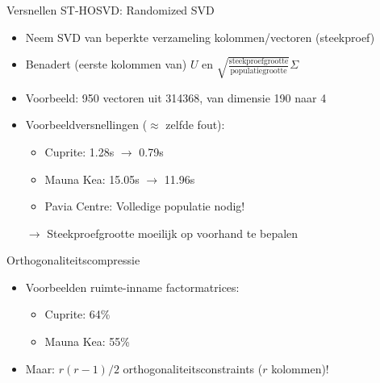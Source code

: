 \documentclass[t,12pt,dutch
\ifx\beamermode\undefined\else,\beamermode\fi
]{beamer}
\begin{document}
\begin{frame}{Versnellen ST-HOSVD: Randomized SVD}
\begin{itemize}
\item Neem SVD van beperkte verzameling kolommen/vectoren (steekproef)
\item Benadert (eerste kolommen van) $U$ en $\sqrt{\frac{\text{steekproefgrootte}}{\text{populatiegrootte}}} \Sigma$
\item Voorbeeld: 950 vectoren uit 314368, van dimensie 190 naar 4
\item Voorbeeldversnellingen ($\approx$ zelfde fout):
\begin{itemize}
\item Cuprite: 1.28s $\rightarrow$ 0.79s
\item Mauna Kea: 15.05s $\rightarrow$ 11.96s
\item Pavia Centre: Volledige populatie nodig!
\end{itemize}
$\rightarrow$ Steekproefgrootte moeilijk op voorhand te bepalen
\end{itemize}
\end{frame}

\begin{frame}{Orthogonaliteitscompressie}

\begin{itemize}
\item Voorbeelden ruimte-inname factormatrices:
\begin{itemize}
\item Cuprite: 64\%
\item Mauna Kea: 55\%
\end{itemize}
\item Maar: $r (r - 1)/2$ orthogonaliteitsconstraints ($r$ kolommen)!
\end{itemize}

\end{frame}
\end{document}
